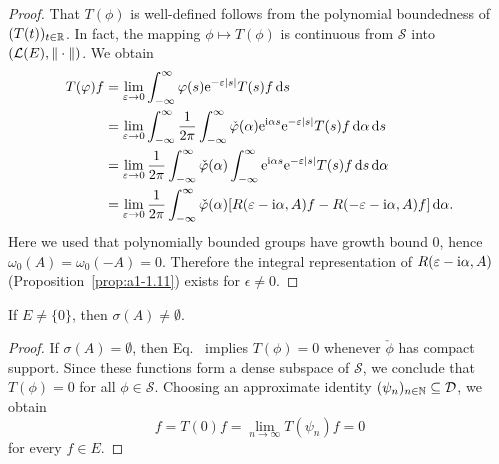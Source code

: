 \begin{proof}
That $T(\phi)$ is well-defined follows from the polynomial boundedness of\/ $(T(t))_{t\in\mathbb{R}}$.
In fact, the mapping $\phi \mapsto T(\phi)$ is continuous from $\mathcal{S}$ into $(\mathcal{L}(E),\|\cdot\|)$.
We obtain
\begin{align*}
	T(\phi)f &= \lim_{\epsilon\to 0} \int_{-\infty}^{\infty} \phi(s)\eu^{-\epsilon|s|}T(s)f \ds \\
	&= \lim_{\epsilon\to 0} \int_{-\infty}^{\infty} \frac{1}{2\pi}\int_{-\infty}^{\infty} \check{\phi}(\alpha)\eu^{\im\alpha s}\eu^{-\epsilon|s|}T(s)f \diff{\alpha} \ds \\
	&= \lim_{\epsilon\to 0} \frac{1}{2\pi}\int_{-\infty}^{\infty} \check{\phi}(\alpha)\int_{-\infty}^{\infty} \eu^{\im\alpha s}\eu^{-\epsilon|s|}T(s)f \ds \diff{\alpha}\\
	&= \lim_{\epsilon\to 0} \frac{1}{2\pi}\int_{-\infty}^{\infty} \check{\phi}(\alpha)[R(\epsilon-\im\alpha,A)f - R(-\epsilon-\im\alpha,A)f] \diff{\alpha}  .
\end{align*}
Here we used that polynomially bounded groups have growth bound $0$, hence $\omega_{0}(A) = \omega_{0}(-A) = 0$.
Therefore the integral representation of\/ $R(\epsilon-\im\alpha,A)$ (\cf Proposition~\ref{prop:a1-1.11}) exists for $\epsilon \neq 0$.
\end{proof}
\begin{lemma}\label{lem:a3-7.6}
If\/ $E \neq \{0\}$, then $\sigma(A) \neq \emptyset$.
\end{lemma}
\begin{proof}
If\/ $\sigma(A) = \emptyset$, then Eq.~ implies $T(\phi) = 0$ whenever $\check{\phi}$ has compact support.
Since these functions form a dense subspace of\/ $\mathcal{S}$, we conclude that $T(\phi) = 0$ for all $\phi \in \mathcal{S}$.
Choosing an approximate identity $(\psi_{n})_{n\in\mathbb{N}} \subseteq \mathcal{D}$, we obtain
\[
f = T(0)f = \lim_{n\to\infty} T(\psi_{n})f = 0
\]
for every $f \in E$.
\end{proof}
